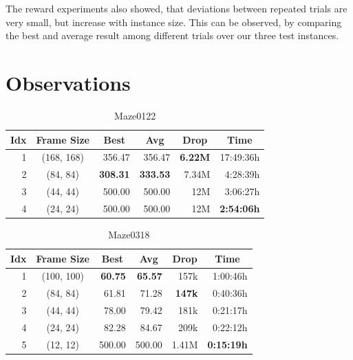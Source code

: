 The reward experiments also showed, that deviations between repeated trials are very small, but increase with instance size. This can be observed, by comparing the best and average result among different trials over our three test instances.

\section{Observations} \label{sec:EvalObs}
\begin{table}[htp]
    \begin{center}
        \begin{tabular}{rcrrrr}
            \toprule
            \multicolumn{1}{c}{Idx} & \multicolumn{1}{c}{Frame Size} & \multicolumn{1}{c}{Best} & \multicolumn{1}{c}{Avg} & \multicolumn{1}{c}{Drop} & \multicolumn{1}{c}{Time}\\
            \midrule
            1 & (168, 168) & 356.47 & 356.47 & \textbf{6.22M} & 17:49:36h \\
            2 & (84, 84) & \textbf{308.31} & \textbf{333.53} & 7.34M & 4:28:39h \\
            3 & (44, 44) & 500.00 & 500.00 & 12M & 3:06:27h \\
            4 & (24, 24) & 500.00 & 500.00 & 12M & \textbf{2:54:06h} \\
            \bottomrule
        \end{tabular}
    \end{center}
    \caption{Maze0122}
\end{table}

\begin{table}[htp]
    \begin{center}
        \begin{tabular}{rcrrrr}
            \toprule
            \multicolumn{1}{c}{Idx} & \multicolumn{1}{c}{Frame Size} & \multicolumn{1}{c}{Best} & \multicolumn{1}{c}{Avg} & \multicolumn{1}{c}{Drop} & \multicolumn{1}{c}{Time}\\
            \midrule
            1 & (100, 100) & \textbf{60.75} & \textbf{65.57} & 157k & 1:00:46h \\
            2 & (84, 84) & 61.81 & 71.28 & \textbf{147k} & 0:40:36h \\
            3 & (44, 44) & 78.00 & 79.42 & 181k & 0:21:17h \\
            4 & (24, 24) & 82.28 & 84.67 & 209k & 0:22:12h \\
            5 & (12, 12) & 500.00 & 500.00 & 1.41M & \textbf{0:15:19h} \\
            \bottomrule
        \end{tabular}
    \end{center}
    \caption{Maze0318}
\end{table}

